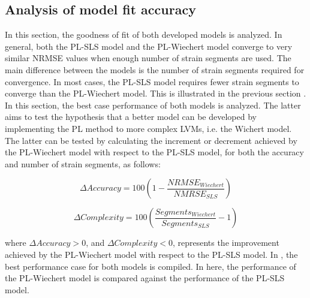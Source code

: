 \subsection{Analysis of model fit accuracy} \label{ModelfitAnalysis}

In this section, the goodness of fit of both developed models is analyzed. In general, both the PL-SLS model and the PL-Wiechert model converge to very similar NRMSE values when enough number of strain segments are used. The main difference between the models is the number of strain segments required for convergence. In most cases, the PL-SLS model requires fewer strain segments to converge than the PL-Wiechert model. This is illustrated in the previous section . In this section, the best case performance of both models is analyzed. The latter aims to test the hypothesis that a better model can be developed by implementing the PL method to more complex LVMs, i.e. the Wichert model. The latter can be tested by calculating the increment or decrement achieved by the PL-Wiechert model with respect to the PL-SLS model, for both the accuracy and number of strain segments, as follows:

\begin{equation}
	\Delta Accuracy = 100\left(1 - \frac{NRMSE_{Wiechert}}{NMRSE_{SLS}} \right)
\end{equation}

\begin{equation}
	\Delta Complexity = 100\left( \frac{Segments_{Wiechert}}{Segments_{SLS}} - 1 \right)
\end{equation}

\noindent where $\Delta Accuracy > 0$, and $\Delta Complexity < 0$, represents the improvement achieved by the PL-Wiechert model with respect to the PL-SLS model. In , the best performance case for both models is compiled. In here, the performance of the PL-Wiechert model is compared against the performance of the PL-SLS model.

